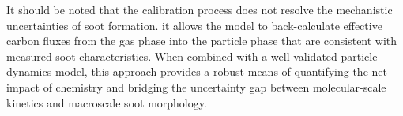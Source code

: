 It should be noted that the calibration process does not resolve the mechanistic uncertainties of soot formation. it allows the model to back-calculate effective carbon fluxes from the gas phase into the particle phase that are consistent with measured soot characteristics. When combined with a well-validated particle dynamics model, this approach provides a robust means of quantifying the net impact of chemistry and bridging the uncertainty gap between molecular-scale kinetics and macroscale soot morphology.
%
